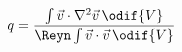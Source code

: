 \begin{equation}\label{eq:hit_lundgren_forcing}
  q = \frac
    {\int \vec{v} \cdot \nabla^2\vec{v} \, \odif{V}}
    {\Reyn \int \vec{v} \cdot \vec{v} \, \odif{V}}
\end{equation}
